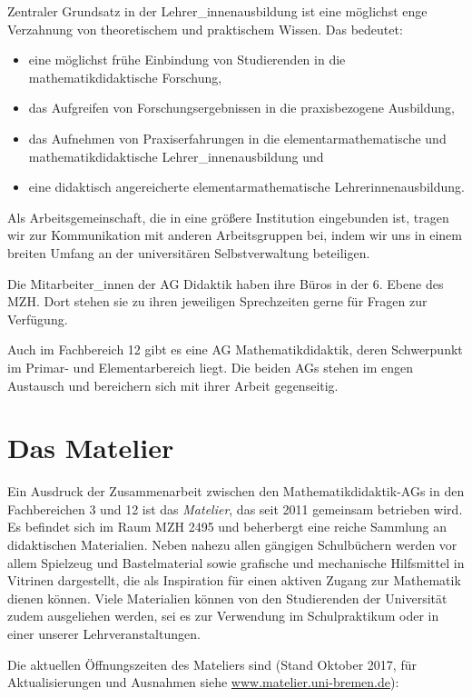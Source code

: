 \documentclass[ngerman,oneside,12pt,a4paper]{scrbook}
\begin{document}
Zentraler Grundsatz in der Lehrer\_innenausbildung ist eine möglichst
enge Verzahnung von theoretischem und praktischem Wissen. Das bedeutet:

\begin{itemize}
\item
  eine möglichst frühe Einbindung von Studierenden in die
  mathematikdidaktische Forschung,
\item
  das Aufgreifen von Forschungsergebnissen in die praxisbezogene
  Ausbildung,
\item
  das Aufnehmen von Praxiserfahrungen in die elementarmathematische und
  mathematikdidaktische Lehrer\_innenausbildung und
\item
  eine didaktisch angereicherte elementarmathematische
  Lehrerinnenausbildung.
\end{itemize}

Als Arbeitsgemeinschaft, die in eine größere Institution eingebunden
ist, tragen wir zur Kommunikation mit anderen Arbeitsgruppen bei, indem
wir uns in einem breiten Umfang an der universitären Selbstverwaltung
beteiligen.

Die Mitarbeiter\_innen der AG Didaktik haben ihre Büros in der 6. Ebene
des MZH. Dort stehen sie zu ihren jeweiligen Sprechzeiten gerne für
Fragen zur Verfügung.

Auch im Fachbereich 12 gibt es eine AG Mathematikdidaktik, deren
Schwerpunkt im Primar- und Elementarbereich liegt. Die beiden AGs stehen
im engen Austausch und bereichern sich mit ihrer Arbeit gegenseitig.

\section{Das Matelier}\label{das-matelier}

Ein Ausdruck der Zusammenarbeit zwischen den Mathematikdidaktik-AGs in
den Fachbereichen 3 und 12 ist das \emph{Matelier}, das seit 2011
gemeinsam betrieben wird. Es befindet sich im Raum MZH 2495 und
beherbergt eine reiche Sammlung an didaktischen Materialien. Neben
nahezu allen gängigen Schulbüchern werden vor allem Spielzeug und
Bastelmaterial sowie grafische und mechanische Hilfsmittel in Vitrinen
dargestellt, die als Inspiration für einen aktiven Zugang zur Mathematik
dienen können. Viele Materialien können von den Studierenden der
Universität zudem ausgeliehen werden, sei es zur Verwendung im
Schulpraktikum oder in einer unserer Lehrveranstaltungen.

Die aktuellen Öffnungszeiten des Mateliers sind (Stand Oktober 2017, für
Aktualisierungen und Ausnahmen siehe \url{www.matelier.uni-bremen.de}):
\end{document}
